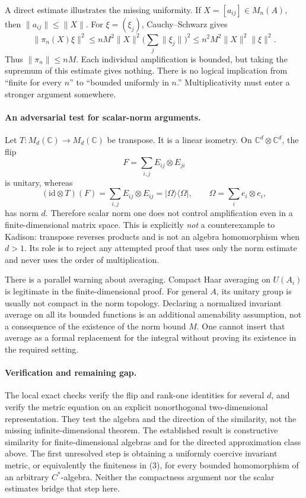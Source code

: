 \documentclass[11pt]{article}
\begin{document}
A direct estimate illustrates the missing uniformity. If $X=[a_{ij}]\in M_n(A)$, then $\|a_{ij}\|\le\|X\|$. For $\xi=(\xi_j)$, Cauchy--Schwarz gives
\[
 \|\pi_n(X)\xi\|^2
 \le nM^2\|X\|^2\Big(\sum_j\|\xi_j\|\Big)^2
 \le n^2M^2\|X\|^2\|\xi\|^2.
\]
Thus $\|\pi_n\|\le nM$. Each individual amplification is bounded, but taking the supremum of this estimate gives nothing. There is no logical implication from ``finite for every $n$'' to ``bounded uniformly in $n$.'' Multiplicativity must enter a stronger argument somewhere.

\paragraph{An adversarial test for scalar-norm arguments.}
Let $T:M_d(\mathbb C)\to M_d(\mathbb C)$ be transpose. It is a linear isometry. On $\mathbb C^d\otimes\mathbb C^d$, the flip
\[
 F=\sum_{i,j}E_{ij}\otimes E_{ji}
\]
is unitary, whereas
\[
 (\mathrm{id}\otimes T)(F)
 =\sum_{i,j}E_{ij}\otimes E_{ij}
 =|\Omega\rangle\langle\Omega|,\qquad
 \Omega=\sum_i e_i\otimes e_i,
\]
has norm $d$. Therefore scalar norm one does not control amplification even in a finite-dimensional matrix space. This is explicitly \emph{not} a counterexample to Kadison: transpose reverses products and is not an algebra homomorphism when $d>1$. Its role is to reject any attempted proof that uses only the norm estimate and never uses the order of multiplication.

There is a parallel warning about averaging. Compact Haar averaging on $U(A_i)$ is legitimate in the finite-dimensional proof. For general $A$, its unitary group is usually not compact in the norm topology. Declaring a normalized invariant average on all its bounded functions is an additional amenability assumption, not a consequence of the existence of the norm bound $M$. One cannot insert that average as a formal replacement for the integral without proving its existence in the required setting.

\paragraph{Verification and remaining gap.}
The local exact checks verify the flip and rank-one identities for several $d$, and verify the metric equation on an explicit nonorthogonal two-dimensional representation. They test the algebra and the direction of the similarity, not the missing infinite-dimensional theorem. The established result is constructive similarity for finite-dimensional algebras and for the directed approximation class above. The first unresolved step is obtaining a uniformly coercive invariant metric, or equivalently the finiteness in (3), for every bounded homomorphism of an arbitrary $C^*$-algebra. Neither the compactness argument nor the scalar estimates bridge that step here.
\end{document}
